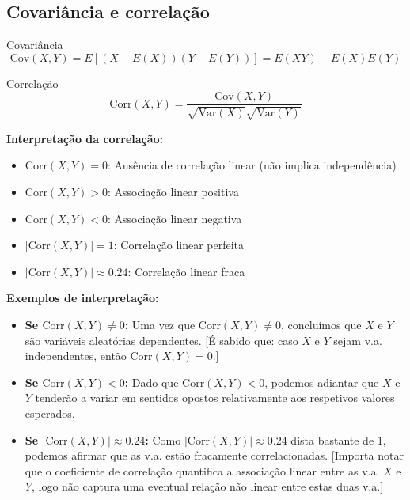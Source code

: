 \documentclass[a4paper,12pt]{article}
\begin{document}
\subsection{Covariância e correlação}

\begin{formulabox}{Covariância}
\begin{equation}\label{formula20}\tag{Fórmula 20}
    \mathrm{Cov}(X, Y) = E[(X - E(X))(Y - E(Y))] = E(XY) - E(X)E(Y)
\end{equation}
\end{formulabox}

\begin{formulabox}{Correlação}
\begin{equation}\label{formula21}\tag{Fórmula 21}
    \mathrm{Corr}(X, Y) = \frac{\mathrm{Cov}(X, Y)}{\sqrt{\mathrm{Var}(X)} \sqrt{\mathrm{Var}(Y)}}
\end{equation}

\textbf{Interpretação da correlação:}
\begin{itemize}
    \item $\mathrm{Corr}(X, Y) = 0$: Ausência de correlação linear (não implica independência)
    \item $\mathrm{Corr}(X, Y) > 0$: Associação linear positiva
    \item $\mathrm{Corr}(X, Y) < 0$: Associação linear negativa
    \item $|\mathrm{Corr}(X, Y)| = 1$: Correlação linear perfeita
    \item $|\mathrm{Corr}(X, Y)| \approx 0.24$: Correlação linear fraca
\end{itemize}

\textbf{Exemplos de interpretação:}
\begin{itemize}
    \item \textbf{Se $\mathrm{Corr}(X, Y) \neq 0$:} Uma vez que $\mathrm{Corr}(X, Y) \neq 0$, concluímos que $X$ e $Y$ são variáveis aleatórias dependentes. [É sabido que: caso $X$ e $Y$ sejam v.a. independentes, então $\mathrm{Corr}(X, Y) = 0$.]
    \item \textbf{Se $\mathrm{Corr}(X, Y) < 0$:} Dado que $\mathrm{Corr}(X, Y) < 0$, podemos adiantar que $X$ e $Y$ tenderão a variar em sentidos opostos relativamente aos respetivos valores esperados.
    \item \textbf{Se $|\mathrm{Corr}(X, Y)| \approx 0.24$:} Como $|\mathrm{Corr}(X, Y)| \approx 0.24$ dista bastante de 1, podemos afirmar que as v.a. estão fracamente correlacionadas. [Importa notar que o coeficiente de correlação quantifica a associação linear entre as v.a. $X$ e $Y$, logo não captura uma eventual relação não linear entre estas duas v.a.]
\end{itemize}
\end{formulabox}
\end{document}

